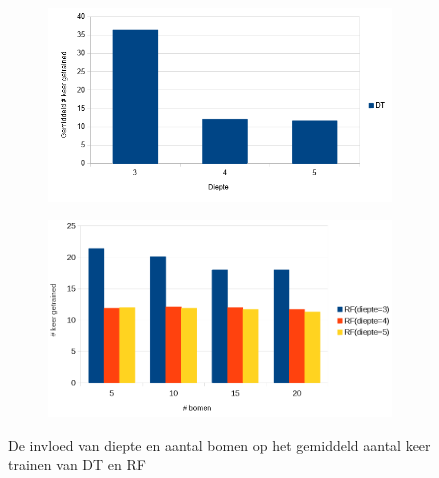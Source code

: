 \begin{figure}[htp!]
\centering
\begin{subfigure}{\textwidth}
  \centering
    \hspace*{-0.75cm}                                                           
  \includegraphics[width=\linewidth]{images/evaluatie/aantalkeertrainendt.png}
\end{subfigure}
\begin{subfigure}{\textwidth}
  \centering
  \includegraphics[width=\linewidth]{images/evaluatie/aantalkeertrainenrf.png}
\end{subfigure}
\caption{De invloed van diepte en aantal bomen op het gemiddeld aantal keer trainen van DT en RF}
\label{fig:invloed diepte en aantal bomen trainen}
\end{figure}
